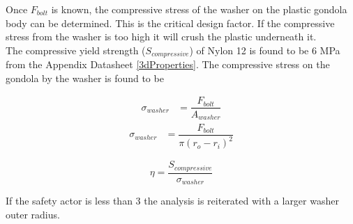 \documentclass[../main.tex]{subfiles}
\begin{document}
Once $F_{bolt}$ is known, the compressive stress of the washer on the plastic gondola body can be determined. This is the critical design factor. If the compressive stress from the washer is too high it will crush the plastic underneath it.\\

The compressive yield strength ($S_{compressive}$) of Nylon 12  is found to be 6 MPa from the Appendix Datasheet \ref{3dProperties}. The compressive stress on the gondola by the washer is found to be 

\begin{align*}
\sigma _{washer} &= \dfrac{F_{bolt}}{A_{washer}}
\end{align*}
\begin{align}
\sigma _{washer} &= \dfrac{F_{bolt}}{\pi (r_o - r_i)^2}
\end{align}

\begin{equation}
\eta = \dfrac{S_{compressive}}{\sigma _{washer}}
\end{equation}

If the safety actor is less than 3 the analysis is reiterated with a larger washer outer radius. 
\end{document}
